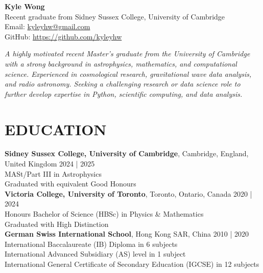 \documentclass[a4paper,10pt]{extarticle}
\begin{document}
\pagestyle{fancy}
\renewcommand{\headrulewidth}{0pt}
\fancyhead{}
\fancyhead[R]{\textit{\monthyeardate\today}}
\thispagestyle{empty} %

\begin{flushleft}
\textbf{\LARGE Kyle Wong}\\[0.5em] %
Recent graduate from Sidney Sussex College, University of Cambridge
\\ Email: \href{mailto:kyleyhw@gmail.com}{kyleyhw@gmail.com} %
\\ GitHub: \url{https://github.com/kyleyhw}

\vspace{1em}
\textit{A highly motivated recent Master's graduate from the University of Cambridge with a strong background in astrophysics, mathematics, and computational science. Experienced in cosmological research, gravitational wave data analysis, and radio astronomy. Seeking a challenging research or data science role to further develop expertise in Python, scientific computing, and data analysis.}
\end{flushleft}

\section*{EDUCATION}
\textbf{Sidney Sussex College, University of Cambridge}, Cambridge, England, United Kingdom \hfill 2024 | 2025\\
MASt/Part III in Astrophysics\\
Graduated with equivalent Good Honours\\



\textbf{Victoria College, University of Toronto}, Toronto, Ontario, Canada \hfill 2020 | 2024\\ %
Honours Bachelor of Science (HBSc) in Physics \& Mathematics\\
Graduated with High Distinction\\


\textbf{German Swiss International School}, Hong Kong SAR, China \hfill 2010 | 2020\\ %
International Baccalaureate (IB) Diploma in 6 subjects\\
International Advanced Subsidiary (AS) level in 1 subject\\
International General Certificate of Secondary Education (IGCSE) in 12 subjects
\end{document}
